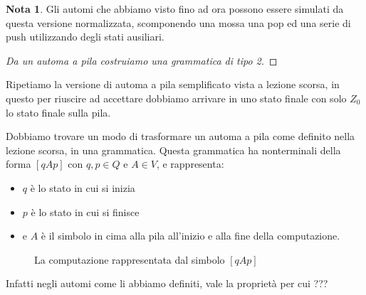 \documentclass[12pt]{report}
\theoremstyle{definition}
\newtheorem{nota}{Nota}
\begin{document}
\begin{nota}
	Gli automi che abbiamo visto fino ad ora possono essere simulati da questa versione normalizzata, scomponendo una mossa una pop ed una serie di push utilizzando degli stati ausiliari.
\end{nota}

\begin{proof}[Da un automa a pila costruiamo una grammatica di tipo 2]
\end{proof}

Ripetiamo la versione di automa a pila semplificato vista a lezione scorsa, in questo per riuscire ad accettare dobbiamo arrivare in uno stato finale con solo $Z_0$ lo stato finale sulla pila.

Dobbiamo trovare un modo di trasformare un automa a pila come definito nella lezione scorsa, in una grammatica.
Questa grammatica ha nonterminali della forma $[qAp]$ con $q, p \in Q$ e $A \in V$, e rappresenta:
\begin{itemize}
	\item $q$ è lo stato in cui si inizia
	\item $p$ è lo stato in cui si finisce 
	\item e $A$ è il simbolo in cima alla pila all'inizio e alla fine della computazione.
\end{itemize}
\begin{figure}[H]
	\centering
	\caption{La computazione rappresentata dal simbolo $[qAp]$}
\end{figure}
Infatti negli automi come li abbiamo definiti, vale la proprietà per cui ??? %
\end{document}

